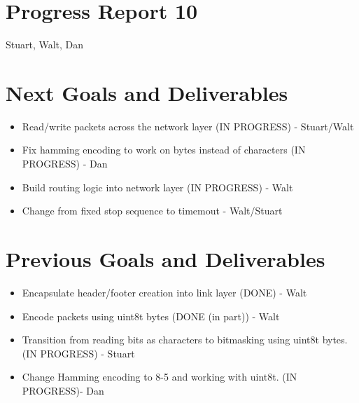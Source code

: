 \documentclass{article}
\begin{document}
\section*{Progress Report 10}
Stuart, Walt, Dan

\section*{Next Goals and Deliverables}
\begin{itemize}
    \item Read/write packets across the network layer (IN PROGRESS) - Stuart/Walt
    \item Fix hamming encoding to work on bytes instead of characters (IN PROGRESS) - Dan
    \item Build routing logic into network layer (IN PROGRESS) - Walt
    \item Change from fixed stop sequence to timemout - Walt/Stuart
\end{itemize}

\section*{Previous Goals and Deliverables}
\begin{itemize}
    \item Encapsulate header/footer creation into link layer (DONE) - Walt
    \item Encode packets using uint8t bytes (DONE (in part)) - Walt
    \item Transition from reading bits as characters to bitmasking using uint8t bytes. (IN PROGRESS) - Stuart
    \item Change Hamming encoding to 8-5 and working with uint8t. (IN PROGRESS)- Dan
\end{itemize}

\end{document}
